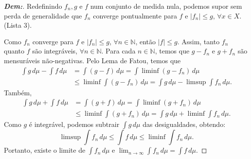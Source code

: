 \begin{proof}[\textbf{Dem:}]
Redefinindo $f_n, g$ e $f$ num conjunto de medida nula, podemos supor sem perda de generalidade que $f_n$ converge pontualmente para $f$ e $|f_n| \le g$, $\forall x \in X$. (Lista 3).

Como $f_n$ converge para $f$ e $|f_n| \le g$, $\forall n \in \mathbb{N}$, então $|f| \le g$. Assim, tanto $f_n$ quanto $f$ são integráveis, $\forall n \in \mathbb{N}$. 
Para cada $n \in \mathbb{N}$, temos que $g - f_n$ e $g + f_n$ são mensuráveis não-negativas. Pelo Lema de Fatou, temos que
\begin{align*}
  \int g \, d\mu - \int f \, d\mu &= \int (g - f) \, d\mu = \int \liminf (g - f_n) \, d\mu\\ 
  &\le \liminf \int (g - f_n) \, d\mu = \int g \, d\mu - \limsup \int f_n \, d\mu. 
\end{align*}
Também,
  \begin{align*}
  \int g \, d\mu + \int f \, d\mu &= \int (g + f) \, d\mu = \int \liminf (g + f_n) \, d\mu\\
  &\le \liminf \int (g + f_n) \, d\mu = \int g \, d\mu + \liminf \int f_n \, d\mu.  
  \end{align*}
Como $g$ é integrável, podemos subtrair $\int g \, d\mu$ das desigualdades, obtendo:
$$ \limsup \int f_n \, d\mu \le \int f \, d\mu \le \liminf \int f_n \, d\mu. $$
Portanto, existe o limite de $\int f_n \, d\mu$ e $\lim_{n \to \infty} \int f_n \, d\mu = \int f \, d\mu$.
\end{proof}
